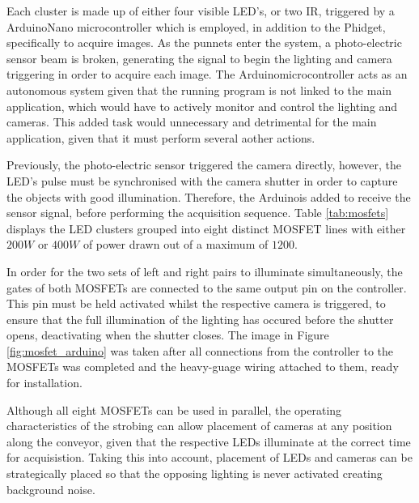 \documentclass[fleqn,twoside]{article}
\begin{document}
Each cluster is made up of either four visible LED's, or two IR, triggered by a Arduino\texttrademark Nano microcontroller which is employed, in addition to the Phidget\textregistered, specifically to acquire images. As the punnets enter the system, a photo-electric sensor beam is broken, generating the signal to begin the lighting and camera triggering in order to acquire each image. The Arduino\texttrademark microcontroller acts as an autonomous system given that the running program is not linked to the main application, which would have to actively monitor and control the lighting and cameras. This added task would unnecessary and detrimental for the main application, given that it must perform several aother actions.   

Previously, the photo-electric sensor triggered the camera directly, however, the LED's pulse must be synchronised with the camera shutter in order to capture the objects with good illumination. Therefore, the Arduino\texttrademark is added to receive the sensor signal, before performing the acquisition sequence. Table \ref{tab:mosfets} displays the LED clusters grouped into eight distinct MOSFET lines with either $200W$ or $400W$ of power drawn out of a maximum of $1200$. 

In order for the two sets of left and right pairs to illuminate simultaneously, the gates of both MOSFETs are connected to the same output pin on the controller. This pin must be held activated whilst the respective camera is triggered, to ensure that the full illumination of the lighting has occured before the shutter opens, deactivating when the shutter closes. The image in Figure \ref{fig:mosfet_arduino} was taken after all connections from the controller to the MOSFETs was completed and the heavy-guage wiring attached to them, ready for installation. 


Although all eight MOSFETs can be used in parallel, the operating characteristics of the strobing can allow placement of cameras at any position along the conveyor, given that the respective LEDs illuminate at the correct time for acquisistion. Taking this into account, placement of LEDs and cameras can be strategically placed so that the opposing lighting is never activated creating background noise.  
\end{document}

